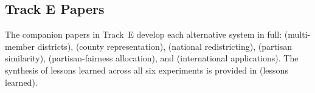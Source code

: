 \subsection{Track E Papers}

The companion papers in Track~E develop each alternative system in full:
\citet{dellaLibera2026e1} (multi-member districts), \citet{dellaLibera2026e2}
(county representation), \citet{dellaLibera2026e3} (national redistricting),
\citet{dellaLibera2026e4} (partisan similarity), \citet{dellaLibera2026e5}
(partisan-fairness allocation), and \citet{dellaLibera2026e6} (international
applications).  The synthesis of lessons learned across all six experiments
is provided in \citet{dellaLibera2026e7} (lessons learned).
